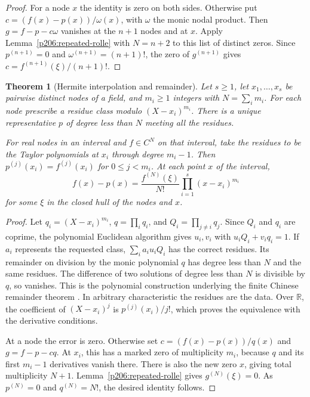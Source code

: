 \documentclass[11pt,oneside,openany]{book}
\theoremstyle{plain}
\newtheorem{theorem}{Theorem}[chapter]
\theoremstyle{definition}
\theoremstyle{remark}
\begin{document}
\begin{proof}
For a node \(x\) the identity is zero on both sides. Otherwise put
\(c=(f(x)-p(x))/\omega(x)\), with \(\omega\) the monic nodal product.
Then \(g=f-p-c\omega\) vanishes at the \(n+1\) nodes and at \(x\).
Apply Lemma~\ref{p206:repeated-rolle} with \(N=n+2\) to this
list of distinct zeros. Since \(p^{(n+1)}=0\) and
\(\omega^{(n+1)}=(n+1)!\), the zero of \(g^{(n+1)}\)
gives \(c=f^{(n+1)}(\xi)/(n+1)!\).
\end{proof}

\begin{theorem}[Hermite interpolation and remainder]\label{p206:W51}
Let \(s\ge1\), let \(x_1,\ldots,x_s\) be pairwise distinct nodes of a field,
and \(m_i\ge1\) integers with \(N=\sum_i m_i\).
For each node prescribe a residue class modulo \((X-x_i)^{m_i}\).
There is a unique representative \(p\) of degree less than \(N\)
meeting all the residues.

For real nodes in an interval and \(f\in C^N\) on that interval,
take the residues to be the Taylor polynomials at \(x_i\) through
degree \(m_i-1\). Then \(p^{(j)}(x_i)=f^{(j)}(x_i)\) for
\(0\le j<m_i\). At each point \(x\) of the interval,
\[
 f(x)-p(x)=\frac{f^{(N)}(\xi)}{N!}
                \prod_{i=1}^s(x-x_i)^{m_i}
\]
for some \(\xi\) in the closed hull of the nodes and \(x\).
\end{theorem}

\begin{proof}
Let \(q_i=(X-x_i)^{m_i}\), \(q=\prod_iq_i\), and
\(Q_i=\prod_{j\ne i}q_j\). Since \(Q_i\) and \(q_i\) are
coprime, the polynomial Euclidean algorithm gives \(u_i,v_i\)
with \(u_iQ_i+v_iq_i=1\). If \(a_i\) represents the requested
class, \(\sum_i a_i u_i Q_i\) has the correct residues.
Its remainder on division by the monic polynomial \(q\)
has degree less than \(N\) and the same residues.
The difference of two solutions of degree less than \(N\)
is divisible by \(q\), so vanishes. This is the polynomial
construction underlying the finite Chinese remainder theorem
\cite[\texttt{K07.09.crt\_finite\_integer}]{d07}.
In arbitrary characteristic the residues are the data.
Over \(\mathbb R\), the coefficient of \((X-x_i)^j\)
is \(p^{(j)}(x_i)/j!\), which proves the equivalence
with the derivative conditions.

At a node the error is zero. Otherwise set
\(c=(f(x)-p(x))/q(x)\) and \(g=f-p-cq\).
At \(x_i\), this has a marked zero of multiplicity \(m_i\),
because \(q\) and its first \(m_i-1\) derivatives vanish
there. There is also the new zero \(x\), giving total
multiplicity \(N+1\). Lemma~\ref{p206:repeated-rolle} gives
\(g^{(N)}(\xi)=0\). As \(p^{(N)}=0\) and \(q^{(N)}=N!\),
the desired identity follows.
\end{proof}
\end{document}
